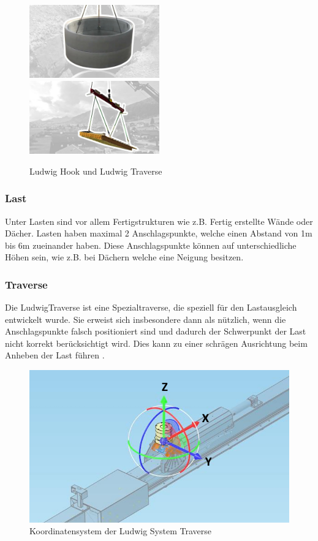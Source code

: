 \begin{figure}[H]
    \centering
    \includegraphics[width=0.5\textwidth]{graphics/Betonelement.jpg}\hfill%
    \includegraphics[width=0.5\textwidth]{graphics/Traverse.jpg}
    \caption{Ludwig Hook und Ludwig Traverse}
    \label{fig:ludwig}
\end{figure}

\subsubsection{Last}
Unter Lasten sind vor allem Fertigstrukturen wie z.B. Fertig erstellte Wände oder Dächer. 
Lasten haben maximal 2 Anschlagspunkte, welche einen Abstand von 1m bis 6m zueinander haben.
Diese Anschlagspunkte können auf unterschiedliche Höhen sein, wie z.B. bei Dächern welche eine
Neigung besitzen.

\clearpage
\subsubsection{Traverse}
Die LudwigTraverse ist eine Spezialtraverse, die speziell für den Lastausgleich entwickelt 
wurde. Sie erweist sich insbesondere dann als nützlich, wenn die Anschlagspunkte 
falsch positioniert sind und dadurch der Schwerpunkt der Last nicht korrekt berücksichtigt wird. 
Dies kann zu einer schrägen Ausrichtung beim Anheben der Last führen \cite{ludwigTraverse}.

\begin{figure}[H]
    \centering
    \includegraphics[width=0.5\linewidth]{graphics/Traverse_Rotationen.PNG}
    \caption{Koordinatensystem der Ludwig System Traverse}
    \label{fig:traverse}
\end{figure}


